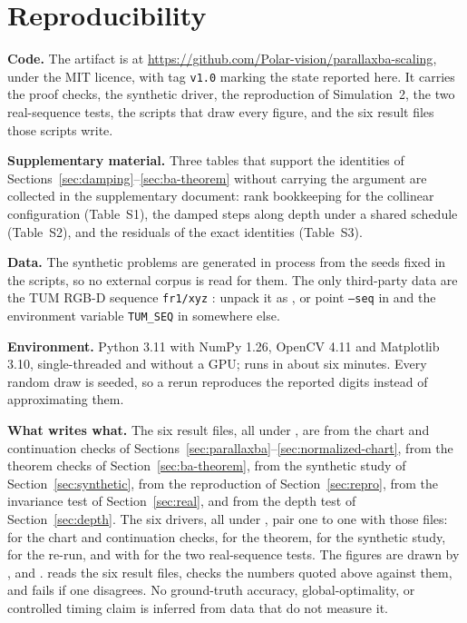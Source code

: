 \documentclass[11pt,a4paper]{article}
\let\cite\citep
\theoremstyle{definition}
\theoremstyle{remark}
\begin{document}
\section*{Reproducibility}
\label{sec:artifact}

\textbf{Code.} The artifact is at \url{https://github.com/Polar-vision/parallaxba-scaling}, under the MIT licence, with tag \texttt{v1.0} marking the state reported here. It carries the proof checks, the synthetic driver, the reproduction of Simulation~2, the two real-sequence tests, the scripts that draw every figure, and the six result files those scripts write.

\textbf{Supplementary material.} Three tables that support the identities of Sections~\ref{sec:damping}--\ref{sec:ba-theorem} without carrying the argument are collected in the supplementary document: rank bookkeeping for the collinear configuration (Table~S1), the damped steps along depth under a shared schedule (Table~S2), and the residuals of the exact identities (Table~S3).

\textbf{Data.} The synthetic problems are generated in process from the seeds fixed in the scripts, so no external corpus is read for them. The only third-party data are the TUM RGB-D sequence \texttt{fr1/xyz} \cite{sturm2012benchmark}: unpack it as , or point \texttt{--seq} in  and the environment variable \texttt{TUM\_SEQ} in  somewhere else.

\textbf{Environment.} Python 3.11 with NumPy 1.26, OpenCV 4.11 and Matplotlib 3.10, single-threaded and without a GPU;  runs in about six minutes. Every random draw is seeded, so a rerun reproduces the reported digits instead of approximating them.

\textbf{What writes what.} The six result files, all under , are  from the chart and continuation checks of Sections~\ref{sec:parallaxba}--\ref{sec:normalized-chart},  from the theorem checks of Section~\ref{sec:ba-theorem},  from the synthetic study of Section~\ref{sec:synthetic},  from the reproduction of Section~\ref{sec:repro},  from the invariance test of Section~\ref{sec:real}, and  from the depth test of Section~\ref{sec:depth}. The six drivers, all under , pair one to one with those files:  for the chart and continuation checks,  for the theorem,  for the synthetic study,  for the re-run, and  with  for the two real-sequence tests. The figures are drawn by ,  and .  reads the six result files, checks the numbers quoted above against them, and fails if one disagrees. No ground-truth accuracy, global-optimality, or controlled timing claim is inferred from data that do not measure it.
\end{document}
